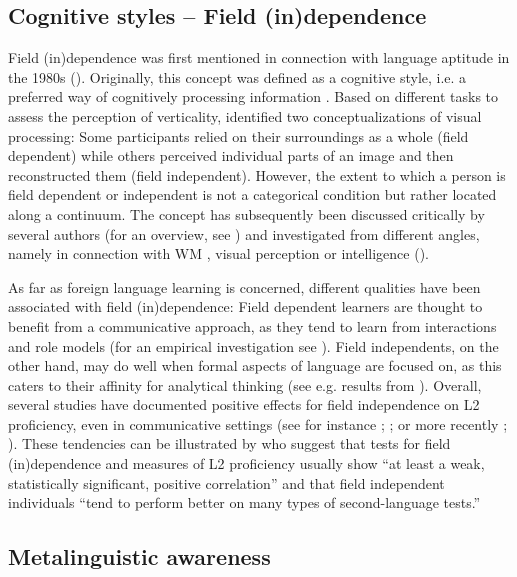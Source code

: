 \documentclass[output=paper]{langscibook}
\begin{document}
\subsection{Cognitive styles – Field (in)dependence} %

Field (in)dependence was first mentioned in connection with language aptitude in the 1980s (\citealt{ChapelleGreen1992}). Originally, this concept was defined as a cognitive style, i.e. a preferred way of cognitively processing information \citep{WitkinEtAl2014}. Based on different tasks to assess the perception of verticality, \citet{Witkin1949} identified two conceptualizations of visual processing: Some participants relied on their surroundings as a whole (field dependent) while others perceived individual parts of an image and then reconstructed them (field independent). However, the extent to which a person is field dependent or independent is not a categorical condition but rather located along a continuum. The concept has subsequently been discussed critically by several authors (for an overview, see \citealt{EvansEtAl2013}) and investigated from different angles, namely in connection with WM \citep{MiyakeEtAl2001}, visual perception \citep{Zhang2004} or intelligence (\citealt{RichardsonTurner2000}).

As far as foreign language learning is concerned, different qualities have been associated with field (in)dependence: Field dependent learners are thought to benefit from a communicative approach, as they tend to learn from interactions and role models (for an empirical investigation see \citealt{JohnsonEtAl2000}). Field independents, on the other hand, may do well when formal aspects of language are focused on, as this caters to their affinity for analytical thinking (see e.g. results from \citealt{StansfieldHansen1983}). Overall, several studies have documented positive effects for field independence on L2 proficiency, even in communicative settings (see for instance \citealt{ChapelleRoberts1986}; \citealt{Carter1988}; or more recently \citealt{FarsiEtAl2014}; \citealt{YaghoubiEtAl2014}). These tendencies can be illustrated by \citet[59]{ChapelleGreen1992} who suggest that tests for field (in)dependence and measures of L2 proficiency usually show “at least a weak, statistically significant, positive correlation” and that field independent individuals “tend to perform better on many types of second-language tests.”

\subsection{Metalinguistic awareness} %
\end{document}
